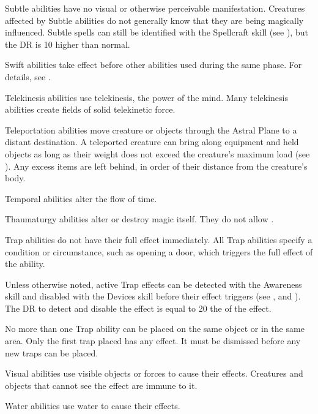      Subtle abilities have no visual or otherwise perceivable manifestation.
    Creatures affected by Subtle abilities do not generally know that they are being magically influenced.
    Subtle spells can still be identified with the Spellcraft skill (see ), but the DR is 10 higher than normal.

     Swift abilities take effect before other abilities used during the same phase.
    For details, see .

     Telekinesis abilities use telekinesis, the power of the mind.
    Many telekinesis abilities create fields of solid telekinetic force.

     Teleportation abilities move creature or objects through the Astral Plane to a distant destination.
    A teleported creature can bring along equipment and held objects as long as their weight does not exceed the creature's maximum load (see ). Any excess items are left behind, in order of their distance from the creature's body.

     Temporal abilities alter the flow of time.

     Thaumaturgy abilities alter or destroy magic itself.
    They do not allow .

     Trap abilities do not have their full effect immediately.
    All Trap abilities specify a condition or circumstance, such as opening a door, which triggers the full effect of the ability.
    \par Unless otherwise noted, active Trap effects can be detected with the Awareness skill and disabled with the Devices skill before their effect triggers (see , and ).
    The DR to detect and disable the effect is equal to 20 \add the  of the effect.
    \par No more than one Trap ability can be placed on the same object or in the same area.
    Only the first trap placed has any effect.
    It must be dismissed before any new traps can be placed.

     Visual abilities use visible objects or forces to cause their effects.
    Creatures and objects that cannot see the effect are immune to it.

     Water abilities use water to cause their effects.

